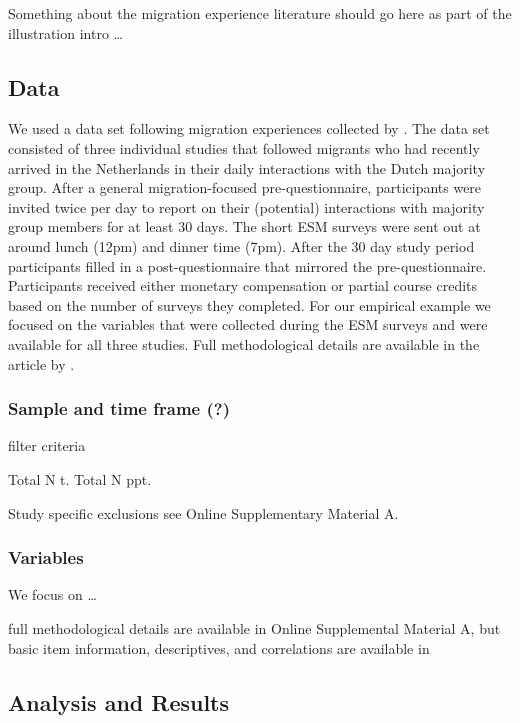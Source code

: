 Something about the migration experience literature should go here as
part of the illustration intro \ldots{}

\subsection{Data}

We used a data set following migration experiences collected by
\citet[][]{Kreienkamp2022b}. The data set consisted of three individual
studies that followed migrants who had recently arrived in the
Netherlands in their daily interactions with the Dutch majority group.
After a general migration-focused pre-questionnaire, participants were
invited twice per day to report on their (potential) interactions with
majority group members for at least 30 days. The short ESM surveys were
sent out at around lunch (12pm) and dinner time (7pm). After the 30 day
study period participants filled in a post-questionnaire that mirrored
the pre-questionnaire. Participants received either monetary
compensation or partial course credits based on the number of surveys
they completed. For our empirical example we focused on the variables
that were collected during the ESM surveys and were available for all
three studies. Full methodological details are available in the article
by \citet[][]{Kreienkamp2022b}.

\subsubsection{Sample and time frame (?)}

filter criteria
\citep[proportion of missing data and imputations:][]{Madley-Dowd2019}

Total N t. Total N ppt.

Study specific exclusions see Online Supplementary Material A.

\subsubsection{Variables}

We focus on \ldots{}

full methodological details are available in Online Supplemental
Material A, but basic item information, descriptives, and correlations
are available in 

\subsection{Analysis and Results}

